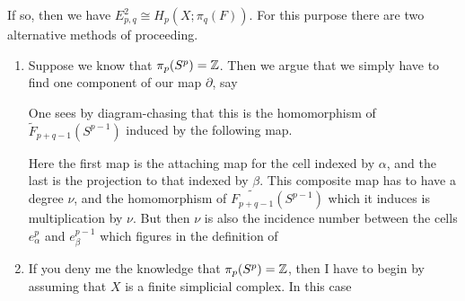 \documentclass[../main]{subfiles}
\begin{document}
\begin{center}
\end{center}

If so, then we have $E_{p,q}^2\cong H_p(X;\pi_q(F))$. For this purpose there are two alternative methods of proceeding.
\begin{enumerate}[label=(\roman*)]
    \item Suppose we know that $\pi_p(S^p)=\mathbb{Z}$. Then we argue that we simply have to find one component of our map $\partial$, say
    \begin{center}
    \end{center}
    One sees by diagram-chasing that this is the homomorphism of $\tilde{F}_{p+q-1}(S^{p-1})$ induced by the following map.
    \begin{center}
    \end{center}
    Here the first map is the attaching map for the cell indexed by $\alpha$, and the last is the projection to that indexed by $\beta$. This composite map has to have a degree $\nu$, and the homomorphism of $\widetilde{F_{p+q-1}}(S^{p-1})$ which it induces is multiplication by $\nu$. But then $\nu$ is also the incidence number between the cells $e_{\alpha}^p$ and $e_{\beta}^{p-1}$ which figures in the definition of \begin{center}
    \end{center}
    \item If you deny me the knowledge that $\pi_p(S^p)=\mathbb{Z}$, then I have to begin by assuming that $X$ is a finite simplicial complex. In this case 

\end{enumerate}
\end{document}
